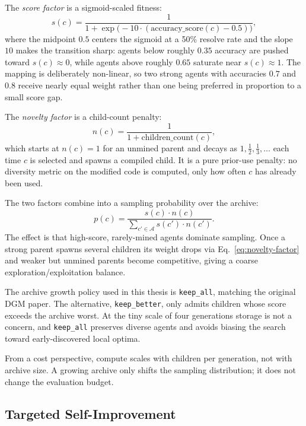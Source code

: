 The \emph{score factor} is a sigmoid-scaled fitness:
\begin{equation}
  s(c) = \frac{1}{1 + \exp\bigl(-10 \cdot (\mathrm{accuracy\_score}(c) - 0.5)\bigr)},
  \label{eq:score-factor}
\end{equation}
where the midpoint $0.5$ centers the sigmoid at a 50\% resolve rate
and the slope $10$ makes the transition sharp: agents below roughly
$0.35$ accuracy are pushed toward $s(c) \approx 0$, while agents above
roughly $0.65$ saturate near $s(c) \approx 1$. The mapping is
deliberately non-linear, so two strong agents with accuracies $0.7$
and $0.8$ receive nearly equal weight rather than one being preferred
in proportion to a small score gap.

The \emph{novelty factor} is a child-count penalty:
\begin{equation}
  n(c) = \frac{1}{1 + \mathrm{children\_count}(c)},
  \label{eq:novelty-factor}
\end{equation}
which starts at $n(c) = 1$ for an unmined parent and decays as
$1, \tfrac{1}{2}, \tfrac{1}{3}, \ldots$ each time $c$ is selected and
spawns a compiled child. It is a pure prior-use penalty: no diversity
metric on the modified code is computed, only how often $c$ has
already been used.

The two factors combine into a sampling probability over the archive:
\begin{equation}
  p(c) = \frac{s(c) \cdot n(c)}{\sum_{c' \in \mathcal{A}} s(c') \cdot n(c')}.
  \label{eq:parent-sampling}
\end{equation}
The effect is that high-score, rarely-mined agents dominate sampling.
Once a strong parent spawns several children its weight drops via
Eq.~\ref{eq:novelty-factor} and weaker but unmined parents become
competitive, giving a coarse exploration/exploitation balance.

The archive growth policy used in this thesis is \texttt{keep\_all},
matching the original DGM paper. The alternative,
\texttt{keep\_better}, only admits children whose score exceeds the
archive worst. At the tiny scale of four generations storage is not a
concern, and \texttt{keep\_all} preserves diverse agents and avoids
biasing the search toward early-discovered local optima.

From a cost perspective, compute scales with children per generation,
not with archive size. A growing archive only shifts the sampling
distribution; it does not change the evaluation budget.

\subsection{Targeted Self-Improvement}

